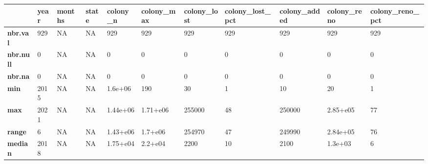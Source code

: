 \documentclass[b4paper]{article}
\begin{document}
    \begin{table}[h]
        \tiny
        \centering
\begin{tabular}{l|l|l|l|l|l|l|l|l|l|l|}
\cline{2-11}
                                        & \textbf{year} & \textbf{months} & \textbf{state} & \textbf{colony\_n} & \textbf{colony\_max} & \textbf{colony\_lost} & \textbf{colony\_lost\_pct} & \textbf{colony\_added} & \textbf{colony\_reno} & \textbf{colony\_reno\_pct} \\ \hline
\multicolumn{1}{|l|}{\textbf{nbr.val}}  & 929           & NA              & NA             & 929                & 929                  & 929                   & 929                        & 929                    & 929                   & 929                        \\ \hline
\multicolumn{1}{|l|}{\textbf{nbr.null}} & 0             & NA              & NA             & 0                  & 0                    & 0                     & 0                          & 0                      & 0                     & 0                          \\ \hline
\multicolumn{1}{|l|}{\textbf{nbr.na}}   & 0             & NA              & NA             & 0                  & 0                    & 0                     & 0                          & 0                      & 0                     & 0                          \\ \hline
\multicolumn{1}{|l|}{\textbf{min}}      & 2015          & NA              & NA             & 1.6e+06            & 190                  & 30                    & 1                          & 10                     & 20                    & 1                          \\ \hline
\multicolumn{1}{|l|}{\textbf{max}}      & 2021          & NA              & NA             & 1.44e+06           & 1.71+e06             & 255000                & 48                         & 250000                 & 2.85+e05              & 77                         \\ \hline
\multicolumn{1}{|l|}{\textbf{range}}    & 6             & NA              & NA             & 1.43+e06           & 1.7+e06              & 254970                & 47                         & 249990                 & 2.84e+05              & 76                         \\ \hline
\multicolumn{1}{|l|}{\textbf{median}}   & 2018          & NA              & NA             & 1.75+e04           & 2.2+e04              & 2200                  & 10                         & 2100                   & 1.3e+03               & 6                          \\ \hline

\end{tabular}
\end{table}
\end{document}

